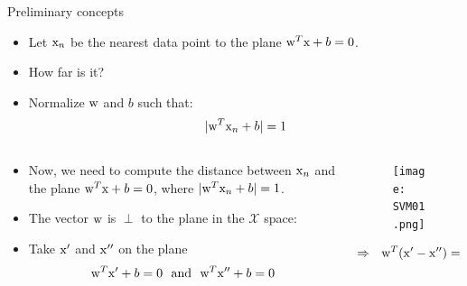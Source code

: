 \begin{frame}{Preliminary concepts}
\begin{itemize}
\item Let ${\rm x}_n$ be the nearest data point to the plane ${\rm w}^T{\rm x}+b=0$. 
\item How far is it?
\item Normalize ${\rm w}$ and $b$ such that:
\[|{\rm w}^T{\rm x}_n+b|=1\]
\end{itemize}
\begin{columns}
\begin{column}{6cm}
\vspace{-12pt}
\begin{itemize}
\item Now, we need to compute the distance between ${\rm x}_n$ and the plane ${\rm w}^T{\rm x}+b=0$, where $|{\rm w}^{T}{\rm x}_n+b|=1$.
\item The vector ${\rm w}$ is $\perp$ to the plane in the $\mathcal{X}$ space:
\item Take ${\rm x}'$ and ${\rm x}''$ on the plane
\[{\rm w}^T{\rm x}'+b=0~~\text{and}~~{\rm w}^T{\rm x}''+b=0\]
\end{itemize}
\end{column}
\begin{column}{4.5cm}
\begin{figure}
\texttt{[image: SVM01.png]}
\end{figure}
\[\Rightarrow~~ {\rm w}^T({\rm x}'-{\rm x}'')=0\]
\end{column}
\end{columns}
\end{frame}

